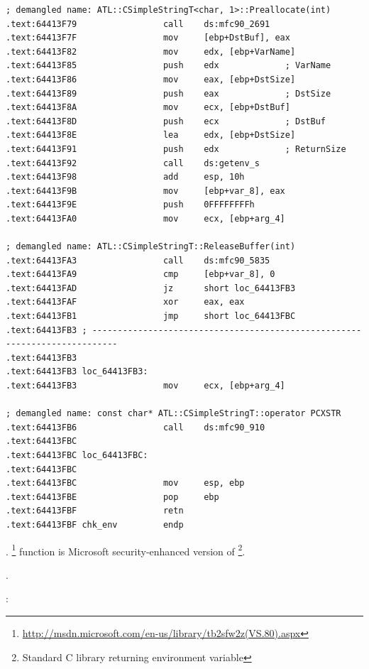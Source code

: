\begin{lstlisting}
; demangled name: ATL::CSimpleStringT<char, 1>::Preallocate(int)
.text:64413F79                 call    ds:mfc90_2691
.text:64413F7F                 mov     [ebp+DstBuf], eax
.text:64413F82                 mov     edx, [ebp+VarName]
.text:64413F85                 push    edx             ; VarName
.text:64413F86                 mov     eax, [ebp+DstSize]
.text:64413F89                 push    eax             ; DstSize
.text:64413F8A                 mov     ecx, [ebp+DstBuf]
.text:64413F8D                 push    ecx             ; DstBuf
.text:64413F8E                 lea     edx, [ebp+DstSize]
.text:64413F91                 push    edx             ; ReturnSize
.text:64413F92                 call    ds:getenv_s
.text:64413F98                 add     esp, 10h
.text:64413F9B                 mov     [ebp+var_8], eax
.text:64413F9E                 push    0FFFFFFFFh
.text:64413FA0                 mov     ecx, [ebp+arg_4]

; demangled name: ATL::CSimpleStringT::ReleaseBuffer(int)
.text:64413FA3                 call    ds:mfc90_5835
.text:64413FA9                 cmp     [ebp+var_8], 0
.text:64413FAD                 jz      short loc_64413FB3
.text:64413FAF                 xor     eax, eax
.text:64413FB1                 jmp     short loc_64413FBC
.text:64413FB3 ; ---------------------------------------------------------------------------
.text:64413FB3
.text:64413FB3 loc_64413FB3:
.text:64413FB3                 mov     ecx, [ebp+arg_4]

; demangled name: const char* ATL::CSimpleStringT::operator PCXSTR 
.text:64413FB6                 call    ds:mfc90_910
.text:64413FBC
.text:64413FBC loc_64413FBC:
.text:64413FBC
.text:64413FBC                 mov     esp, ebp
.text:64413FBE                 pop     ebp
.text:64413FBF                 retn
.text:64413FBF chk_env         endp
\end{lstlisting}

.  \footnote{\url{http://msdn.microsoft.com/en-us/library/tb2sfw2z(VS.80).aspx}} 
{function is Microsoft security-enhanced version of \footnote{Standard C library returning environment variable}}.

.

:

